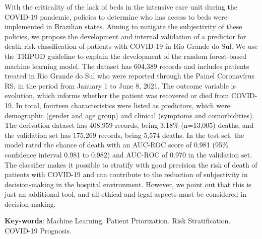 \begin{resumo}[Abstract]


With the criticality of the lack of beds in the intensive care unit during the COVID-19 pandemic, policies to determine who has access to beds were implemented in Brazilian states. Aiming to mitigate the subjectivity of these policies, we propose the development and internal validation of a predictor for death risk classification of patients with COVID-19 in Rio Grande do Sul.
We use the TRIPOD guideline to explain the development of the random forest-based machine learning model.
The dataset has 604,389 records and includes patients treated in Rio Grande do Sul who were reported through the Painel Coronavírus RS, in the period from January 1 to June 8, 2021.
The outcome variable is evolution, which informs whether the patient was recovered or died from COVID-19. In total, fourteen characteristics were listed as predictors, which were demographic (gender and age group) and clinical (symptoms and comorbidities). 
The derivation dataset has 408,959 records, being 3.18\% (n=13,005) deaths, and the validation set has 175,269 records, being 5,574 deaths. In the test set, the model rated the chance of death with an AUC-ROC score of 0.981 (95\% confidence interval 0.981 to 0.982) and AUC-ROC of 0.970 in the validation set.
The classifier makes it possible to stratify with good precision the risk of death of patients with COVID-19 and can contribute to the reduction of subjectivity in decision-making in the hospital environment. However, we point out that this is just an additional tool, and all ethical and legal aspects must be considered in decision-making.
 \vspace{\onelineskip}
 
 \noindent
 \textbf{Key-words}: Machine Learning. Patient Priorization. Risk Stratification. COVID-19 Prognosis.
\end{resumo}

